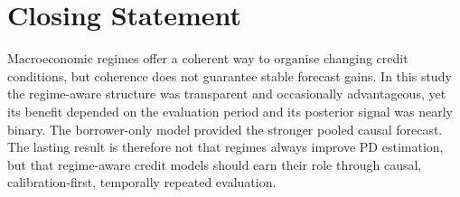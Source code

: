 \section{Closing Statement}

Macroeconomic regimes offer a coherent way to organise changing credit conditions, but coherence does not guarantee stable forecast gains. In this study the regime-aware structure was transparent and occasionally advantageous, yet its benefit depended on the evaluation period and its posterior signal was nearly binary. The borrower-only model provided the stronger pooled causal forecast. The lasting result is therefore not that regimes always improve PD estimation, but that regime-aware credit models should earn their role through causal, calibration-first, temporally repeated evaluation.
